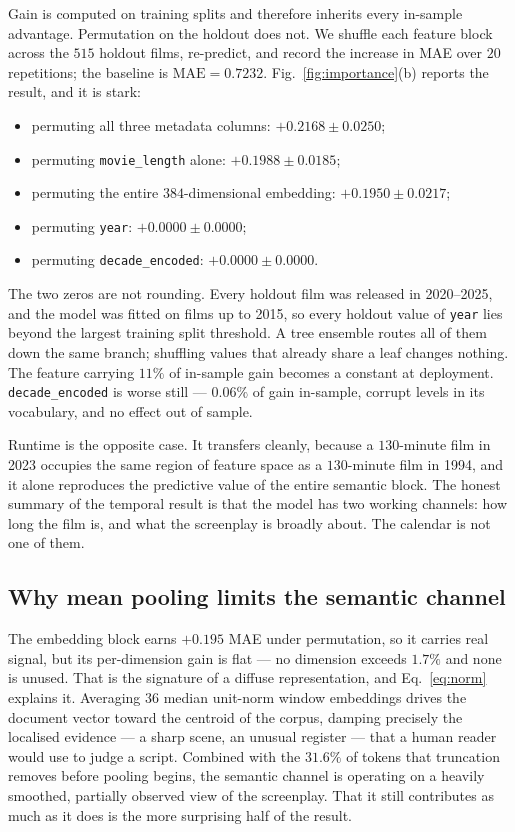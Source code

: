 \documentclass[conference,a4paper]{IEEEtran}
\begin{document}
Gain is computed on training splits and therefore inherits every
in-sample advantage. Permutation on the holdout does not. We shuffle each
feature block across the $515$ holdout films, re-predict, and record the
increase in MAE over $20$ repetitions; the baseline is
$\mathrm{MAE} = 0.7232$. Fig.~\ref{fig:importance}(b) reports the result,
and it is stark:
\begin{itemize}
\item permuting all three metadata columns: $+0.2168 \pm 0.0250$;
\item permuting \texttt{movie\_length} alone: $+0.1988 \pm 0.0185$;
\item permuting the entire $384$-dimensional embedding:
      $+0.1950 \pm 0.0217$;
\item permuting \texttt{year}: $+0.0000 \pm 0.0000$;
\item permuting \texttt{decade\_encoded}: $+0.0000 \pm 0.0000$.
\end{itemize}

The two zeros are not rounding. Every holdout film was released in
2020--2025, and the model was fitted on films up to 2015, so every
holdout value of \texttt{year} lies beyond the largest training split
threshold. A tree ensemble routes all of them down the same branch;
shuffling values that already share a leaf changes nothing. The feature
carrying $11\%$ of in-sample gain becomes a constant at deployment.
\texttt{decade\_encoded} is worse still --- $0.06\%$ of gain in-sample,
corrupt levels in its vocabulary, and no effect out of sample.

Runtime is the opposite case. It transfers cleanly, because a
$130$-minute film in 2023 occupies the same region of feature space as a
$130$-minute film in 1994, and it alone reproduces the predictive value
of the entire semantic block. The honest summary of the temporal result
is that the model has two working channels: how long the film is, and
what the screenplay is broadly about. The calendar is not one of them.

\subsection{Why mean pooling limits the semantic channel}

The embedding block earns $+0.195$ MAE under permutation, so it carries
real signal, but its per-dimension gain is flat --- no dimension exceeds
$1.7\%$ and none is unused. That is the signature of a diffuse
representation, and Eq.~\eqref{eq:norm} explains it. Averaging $36$
median unit-norm window embeddings drives the document vector toward the
centroid of the corpus, damping precisely the localised evidence --- a
sharp scene, an unusual register --- that a human reader would use to
judge a script. Combined with the $31.6\%$ of tokens that truncation
removes before pooling begins, the semantic channel is operating on a
heavily smoothed, partially observed view of the screenplay. That it
still contributes as much as it does is the more surprising half of the
result.
\end{document}
